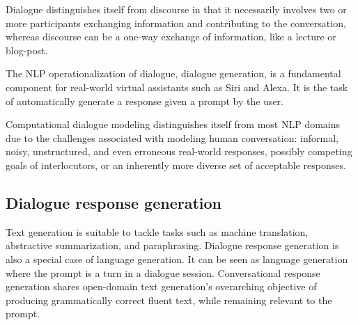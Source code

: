 Dialogue distinguishes itself from discourse in that it necessarily involves two or more participants exchanging information and contributing to the conversation, whereas discourse can be a one-way exchange of information, like a lecture or blog-post.

The NLP operationalization of dialogue, dialogue generation, is a fundamental component for real-world virtual assistants such as Siri and Alexa. It is the task of automatically generate a response given a prompt by the user.

Computational dialogue modeling distinguishes itself from most NLP domains due to the challenges associated with modeling human conversation: informal, noisy, unstructured, and even erroneous real-world responses, possibly competing goals of interlocutors, or an inherently more diverse set of acceptable responses.


\subsection{Dialogue response generation}
Text generation is suitable to tackle tasks such as machine translation, abstractive summarization, and paraphrasing. Dialogue response generation is also a special case of language generation. It can be seen as language generation where the prompt is a turn in a dialogue session. Conversational response generation shares open-domain text generation's overarching objective of producing grammatically correct fluent text, while remaining relevant to the prompt. 



